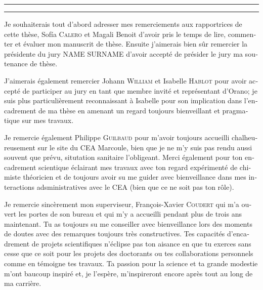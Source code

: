 \begin{otherlanguage}{french}

\hrule\relax
\vspace*{.9\baselineskip}%
\raggedright{\huge{}}\par%
\vspace*{1.1\baselineskip}%
\hrule\relax
\vspace*{\baselineskip}%
\thispagestyle{empty}

\begingroup
\itshape

Je souhaiterais tout d'abord adresser mes remerciements aux rapportrices de cette thèse, Sof{\'{i}}a \textsc{Calero} et Magali Benoit d'avoir pris le temps de lire, commenter et évaluer mon manuscrit de thèse. Ensuite j'aimerais bien sûr remercier la présidente du jury NAME \textsc{SURNAME} d'avoir accepté de présider le jury ma soutenance de thèse. 

J'aimerais également remercier Johann \textsc{William} et Isabelle \textsc{Hablot} pour avoir accepté de participer au jury en tant que membre invité et représentant d'Orano; je suis plus particulièrement reconnaissant à Isabelle pour son implication dans l'encadrement de ma thèse en amenant un regard toujours bienveillant et pragmatique sur mes travaux.

Je remercie également Philippe \textsc{Guilbaud} pour m'avoir toujours accueilli chalheureusement sur le site du CEA Marcoule, bien que je ne m'y suis pas rendu aussi souvent que prévu, situtation sanitaire l'obligeant. Merci également pour ton encadrement scientique éclairant mes travaux avec ton regard expérimenté de chimiste théoricien et de toujours avoir su me guider avec bienveillance dans mes interactions adsministratives avec le CEA (bien que ce ne soit pas ton rôle).

Je remercie sincèrement mon superviseur, François-Xavier \textsc{Coudert} qui m'a ouvert les portes de son bureau et qui m'y a accueilli pendant plus de trois ans maintenant. Tu as toujours su me conseiller avec bienveillance lors des moments de doutes avec des remarques toujours très constructives. Tes capacités d'encadrement de projets scientifiques n'éclipse pas ton aisance en  que tu exerces sans cesse que ce soit pour les projets des doctorants ou tes collaborations personnels comme en témoigne tes travaux. Ta passion pour la science et ta grande modestie m'ont baucoup inspiré et, je l'espère, m'inspireront encore après tout au long de ma carrière.


\end{otherlanguage}
